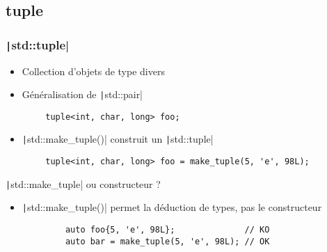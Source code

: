 \documentclass[C++.tex]{subfiles}
\begin{document}
\subsection*{tuple}
\begin{frame}[fragile]
	\frametitle{\texttt|std::tuple|}
	\begin{itemize}
		\item Collection d'objets de type divers
		\item Généralisation de \texttt|std::pair|
	\end{itemize}

	\begin{verbatim}
		tuple<int, char, long> foo;
	\end{verbatim}

	\begin{itemize}
		\item \texttt|std::make_tuple()| construit un \texttt|std::tuple|
	\end{itemize}

	\begin{verbatim}
		tuple<int, char, long> foo = make_tuple(5, 'e', 98L);
	\end{verbatim}

	\begin{block}{\texttt|std::make_tuple| ou constructeur ?}
		\begin{itemize}
			\item \texttt|std::make_tuple()| permet la déduction de types, pas le constructeur
		\end{itemize}

		\begin{verbatim}
			auto foo{5, 'e', 98L};              // KO
			auto bar = make_tuple(5, 'e', 98L); // OK
		\end{verbatim}
	\end{block}
\end{frame}
\end{document}
